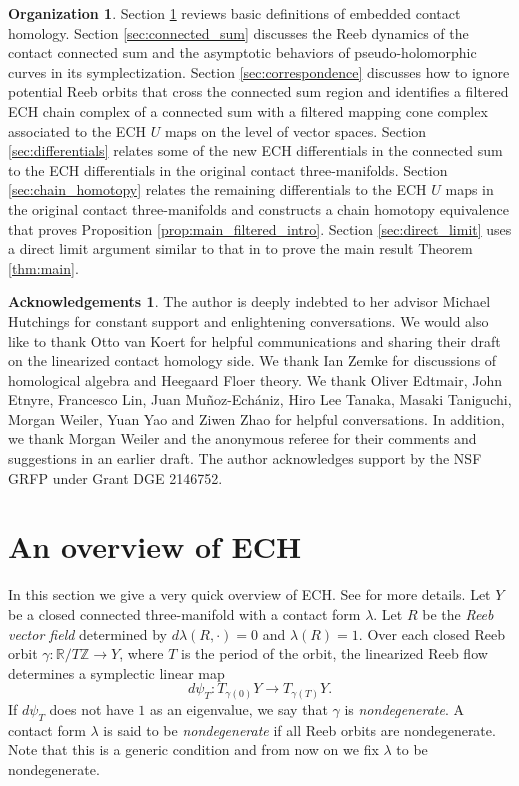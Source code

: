 \documentclass{article}
\numberwithin{equation}{section}
\theoremstyle{definition}
\newtheorem*{acknowledgements*}{Acknowledgements}
\newtheorem*{organization*}{Organization}
\begin{document}
\begin{organization*} Section \ref{sec:overview} reviews basic definitions of embedded contact homology. Section \ref{sec:connected_sum} discusses the Reeb dynamics of the contact connected sum and the asymptotic behaviors of pseudo-holomorphic curves in its symplectization. Section \ref{sec:correspondence} discusses how to ignore potential Reeb orbits that cross the connected sum region and identifies a filtered ECH chain complex of a connected sum with a filtered mapping cone complex associated to the ECH $U$ maps on the level of vector spaces. Section \ref{sec:differentials} relates some of the new ECH differentials in the connected sum to the ECH differentials in the original contact three-manifolds. Section \ref{sec:chain_homotopy} relates the remaining differentials to the ECH $U$ maps in the original contact three-manifolds and constructs a chain homotopy equivalence that proves Proposition \ref{prop:main_filtered_intro}. Section \ref{sec:direct_limit} uses a direct limit argument similar to that in \cite{Nelson_Morgan} to prove the main result Theorem \ref{thm:main}. \end{organization*}

\begin{acknowledgements*} The author is deeply indebted to her advisor Michael Hutchings for constant support and enlightening conversations. We would also like to thank Otto van Koert for helpful communications and sharing their draft on the linearized contact homology side. We thank Ian Zemke for discussions of homological algebra and Heegaard Floer theory. We thank Oliver Edtmair, John Etnyre, Francesco Lin, Juan Mu\~{n}oz-Ech\'{a}niz, Hiro Lee Tanaka, Masaki Taniguchi, Morgan Weiler, Yuan Yao and Ziwen Zhao for helpful conversations. In addition, we thank Morgan Weiler and the anonymous referee for their comments and suggestions in an earlier draft. The author acknowledges support by the NSF GRFP under Grant DGE 2146752. \end{acknowledgements*}

\section{An overview of ECH}
\label{sec:overview}
In this section we give a very quick overview of ECH. See \cite{Hutchings_index_inequality,Hutchings_index_revisited,Hutchings} for more details. Let $Y$ be a closed connected three-manifold with a contact form $\lambda$. Let $R$ be the \emph{Reeb vector field} determined by $d\lambda(R, \cdot) = 0$ and $\lambda(R) = 1$. Over each closed Reeb orbit $\gamma: \mathbb{R}/T\mathbb{Z} \to Y$, where $T$ is the period of the orbit, the linearized Reeb flow determines a symplectic linear map $$d\psi_T:T_{\gamma(0)} Y \longrightarrow T_{\gamma(T)}Y.$$ 
If $d\psi_T$ does not have $1$ as an eigenvalue, we say that $\gamma$ is \emph{nondegenerate}. A contact form $\lambda$ is said to be \emph{nondegenerate} if all Reeb orbits are nondegenerate. Note that this is a generic condition and from now on we fix $\lambda$ to be nondegenerate.
\end{document}

